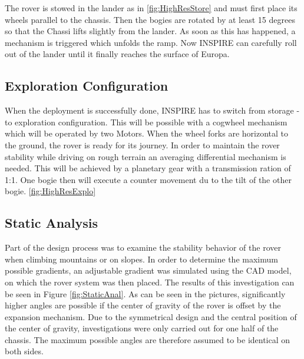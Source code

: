 The rover is stowed in the lander as in \autoref{fig:HighResStore} and must first place its wheels parallel to the chassis. Then the bogies are rotated by at least 15 degrees so that the Chassi lifts slightly from the lander. As soon as this has happened, a mechanism is triggered which unfolds the ramp. Now INSPIRE can carefully roll out of the lander until it finally reaches the surface of Europa.



\subsection{Exploration Configuration}

When the deployment is successfully done, INSPIRE has to switch from storage - to exploration configuration.
This will be possible with a cogwheel mechanism which will be operated by two Motors. When the wheel forks are horizontal to the ground, the rover is ready for its journey.
In order to maintain the rover stability while driving on rough terrain an averaging differential mechanism is needed.
This will be achieved by a planetary gear with a transmission ration of 1:1.
One bogie then will execute a counter movement du to the tilt of the other bogie.
\autoref{fig:HighResExplo}

\subsection{Static Analysis}

Part of the design process was to examine the stability behavior of the rover when climbing mountains or on slopes. In order to determine the maximum possible gradients, an adjustable gradient was simulated using the CAD model, on which the rover system was then placed. The results of this investigation can be seen in Figure \autoref{fig:StaticAnal}. As can be seen in the pictures, significantly higher angles are possible if the center of gravity of the rover is offset by the expansion mechanism. 
Due to the symmetrical design and the central position of the center of gravity, investigations were only carried out for one half of the chassis. The maximum possible angles are therefore assumed to be identical on both sides. 

